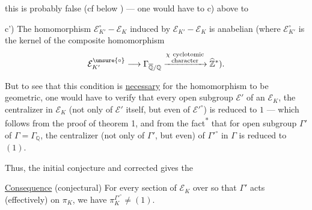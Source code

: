 this is probably false (cf below ) --- one would have to    c) above to

c') The homomorphism $\mathcal E_{K'}^\circ-\mathcal E_K$ induced by $\mathcal E_{K'}-\mathcal E_K$ is anabelian (where $\mathcal E_{K'}^\circ$ is the kernel of the composite homomorphism
\[
\mathcal E_{K'}^{\unsure{\circ}}\longrightarrow\Gamma_{\overline{\mathbb Q}/\mathbb Q}\xrightarrow{\substack{\chi\ \text{cyclotomic}\\\text{character}}}\widehat{\mathbb Z}^{*}).
\]

But to see that this condition is \uline{necessary} for the homomorphism to be geometric, one would have to  verify that  every open subgroup $\mathcal E'$ of an $\mathcal E_K$, the centralizer in $\mathcal E_K$ (not only of $\mathcal E'$ itself, but even of $\mathcal E'^\circ$) is reduced to $1$ --- which follows from the proof of theorem 1, and from the fact\textsuperscript{*} that for  open subgroup $\Gamma'$ of $\Gamma=\Gamma_{\mathbb Q}$, the centralizer (not only of $\Gamma'$, but even) of $\Gamma'^\circ$ in $\Gamma$ is reduced to $(1)$.

Thus, the initial conjecture  and corrected gives the

\uline{Consequence} (conjectural) For every  section of $\mathcal E_K$ over   so that $\Gamma'$ acts (effectively) on $\pi_K$, we have  $\pi_K^{\Gamma'^\circ}\ne(1)$.
